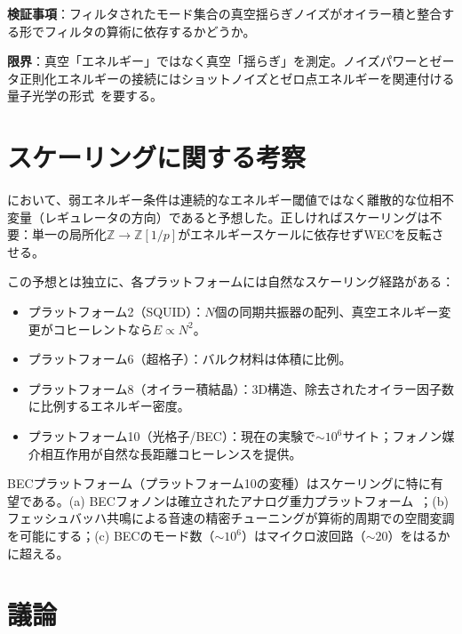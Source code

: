 \documentclass[11pt,a4paper]{article}
\newcommand{\Zp}{\mathbb{Z}[1/p]}
\begin{document}
\textbf{検証事項}：フィルタされたモード集合の真空揺らぎノイズがオイラー積と整合する形でフィルタの算術に依存するかどうか。

\textbf{限界}：真空「エネルギー」ではなく真空「揺らぎ」を測定。ノイズパワーとゼータ正則化エネルギーの接続にはショットノイズとゼロ点エネルギーを関連付ける量子光学の形式~\cite{Caves1981}を要する。

\section{スケーリングに関する考察}
\label{sec:scaling}

\cite{paper_B}において、弱エネルギー条件は連続的なエネルギー閾値ではなく離散的な位相不変量（レギュレータの方向）であると予想した。正しければスケーリングは不要：単一の局所化$\mathbb{Z} \to \Zp$がエネルギースケールに依存せずWECを反転させる。

この予想とは独立に、各プラットフォームには自然なスケーリング経路がある：
\begin{itemize}
\item プラットフォーム2（SQUID）：$N$個の同期共振器の配列、真空エネルギー変更がコヒーレントなら$E \propto N^2$。
\item プラットフォーム6（超格子）：バルク材料は体積に比例。
\item プラットフォーム8（オイラー積結晶）：3D構造、除去されたオイラー因子数に比例するエネルギー密度。
\item プラットフォーム10（光格子/BEC）：現在の実験で$\sim 10^6$サイト；フォノン媒介相互作用が自然な長距離コヒーレンスを提供。
\end{itemize}

BECプラットフォーム（プラットフォーム10の変種）はスケーリングに特に有望である。(a) BECフォノンは確立されたアナログ重力プラットフォーム~\cite{Unruh1981}；(b) フェッシュバッハ共鳴による音速の精密チューニングが算術的周期での空間変調を可能にする；(c) BECのモード数（$\sim 10^6$）はマイクロ波回路（$\sim 20$）をはるかに超える。

\section{議論}
\label{sec:discussion}
\end{document}
